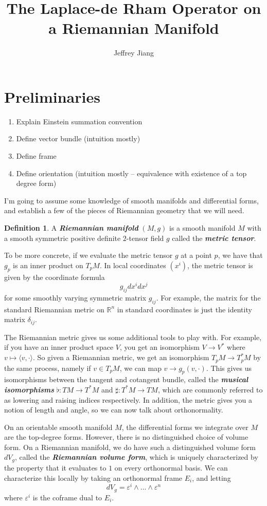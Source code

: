 \documentclass[psamsfonts]{amsart}
\theoremstyle{definition}
\newtheorem{defn}[thm]{Definition}
\theoremstyle{remark}
\newcommand{\R}{\mathbb{R}}
\newcommand{\ib}[1]{\textbf{\textit{#1}}}
\begin{document}
\author{Jeffrey Jiang}
\title{The Laplace-de Rham Operator on a Riemannian Manifold}
\maketitle
%
\section*{Preliminaries}
\begin{enumerate}
\item Explain Einstein summation convention
\item Define vector bundle (intuition mostly)
\item Define frame
\item Define orientation (intuition mostly -- equivalence with existence of a top degree form)
\end{enumerate}
I'm going to assume some knowledge of smooth manifolds and differential forms, and establish a few of the pieces of Riemannian geometry that we will need. 

\begin{defn}
A \ib{Riemannian manifold} $(M,g)$ is a smooth manifold $M$ with a smooth symmetric positive definite $2$-tensor field $g$ called the \ib{metric tensor}. 
\end{defn}
To be more concrete, if we evaluate the metric tensor $g$ at a point $p$, we have that $g_p$ is an inner product on $T_pM$. In local coordinates $(x^i)$, the metric tensor is given by the coordinate formula
$$g_{ij} dx^idx^j $$
for some smoothly varying symmetric matrix $g_{ij}$. For example, the matrix for the standard Riemannian metric on $\R^n$ in standard coordinates is just the identity matrix $\delta_{ij}$.

The Riemannian metric gives us some additional tools to play with. For example, if you have an inner product space $V$, you get an isomorphism $V \to V^*$ where $v \mapsto \langle v, \cdot \rangle$. So given a Riemannian metric, we get an isomorphism $T_pM \to T^*_pM$ by the same process, namely if $v \in T_pM$, we can map $v\to g_p(v,\cdot)$. This gives us isomorphisms between the tangent and cotangent bundle, called the \ib{musical isomorphisms} $\flat: TM \to T^*M$ and $\sharp:T^*M \to TM$, which are commonly referred to as lowering and raising indices respectively. In addition, the metric gives you a notion of length and angle, so we can now talk about orthonormality.

On an orientable smooth manifold $M$, the differential forms we integrate over $M$ are the top-degree forms. However, there is no distinguished choice of volume form. On a Riemannian manifold, we do have such a distinguished volume form $dV_g$, called the \ib{Riemannian volume form}, which is uniquely characterized by the property that it evaluates to $1$ on every orthonormal basis. We can characterize this locally by taking an orthonormal frame $E_i$, and letting 
$$dV_g = \varepsilon^i \wedge \ldots \wedge \varepsilon^n $$
where $\varepsilon^i$ is the coframe dual to $E_i$.
\end{document}
